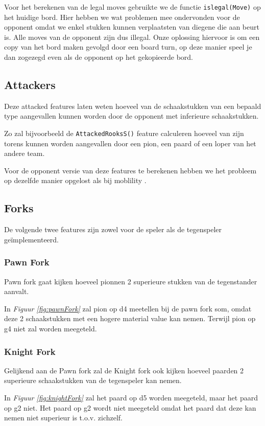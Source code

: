 \documentclass[a4paper,openany]{uantwerpenassignment}
\newcommand{\codeword}[1]{
    \colorbox{code}{\texttt{\textcolor{codetext}{#1}}}
}
\newcommand{\figref}[1]{\textit{Figuur \ref{#1}}}
\begin{document}
Voor het berekenen van de legal moves gebruikte we de functie \codeword{islegal(Move)} op het huidige bord.  Hier hebben we wat problemen mee ondervonden voor de opponent omdat we enkel stukken kunnen verplaatsten van diegene die aan beurt is. Alle moves van de opponent zijn dus illegal. Onze oplossing hiervoor is om een copy van het bord maken gevolgd door een board turn, op deze manier speel je dan zogezegd even als de opponent op het gekopieerde bord. 


\subsection{Attackers}
Deze attacked features laten weten hoeveel van de schaakstukken van een bepaald type aangevallen kunnen worden door de opponent met inferieure schaakstukken. 

Zo zal bijvoorbeeld de \codeword{AttackedRooksS()} feature calculeren hoeveel van zijn torens kunnen worden aangevallen door een pion, een paard of een loper van het andere team.

Voor de opponent versie van deze features te berekenen hebben we het probleem op dezelfde manier opgelost als bij moblility .

\subsection{Forks}

De volgende twee features zijn zowel voor de speler als de tegenspeler geïmplementeerd.

\subsubsection{Pawn Fork}
Pawn fork gaat kijken hoeveel pionnen 2 superieure stukken van de tegenstander aanvalt.

In \figref{fig:pawnFork} zal pion op d4 meetellen bij de pawn fork som, omdat deze 2 schaakstukken met een hogere material value kan nemen. Terwijl pion op g4 niet zal worden meegeteld.
\pagebreak

\subsubsection{Knight Fork}
Gelijkend aan de Pawn fork zal de Knight fork ook kijken hoeveel paarden 2 superieure schaakstukken van de tegenspeler kan nemen.

In \figref{fig:knightFork} zal het paard op d5 worden meegeteld, maar het paard op g2 niet. Het paard op g2 wordt niet meegeteld omdat het paard dat deze kan nemen niet superieur is t.o.v. zichzelf.
\end{document}
